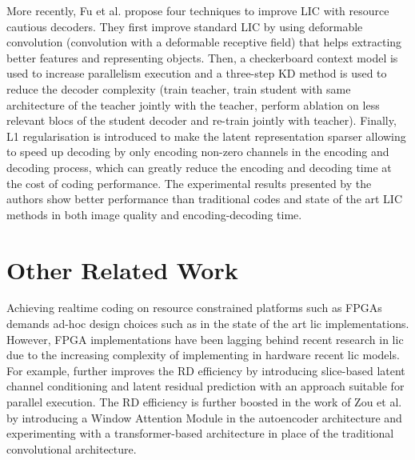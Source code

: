 More recently, Fu et al. \cite{fu2023fasthighperformancelearnedimage} propose four techniques to improve LIC with resource cautious decoders. They first improve standard LIC by using deformable convolution (convolution with a deformable receptive field) that helps extracting better features and representing objects. Then, a checkerboard context model is used to increase parallelism execution and a three-step KD method is used to reduce the decoder complexity (train teacher, train student with same architecture of the teacher jointly with the teacher, perform ablation on less relevant blocs of the student decoder and re-train jointly with teacher). Finally, L1 regularisation is introduced to make the latent representation sparser allowing to speed up decoding by only encoding non-zero channels in the encoding and decoding process, which can greatly reduce the encoding and decoding time at the cost of coding performance. The experimental results presented by the authors show better performance than traditional codes and state of the art LIC methods in both image quality and encoding-decoding time.

\section{Other Related Work}
Achieving realtime coding on resource constrained platforms such as FPGAs demands ad-hoc design choices such as in the state of the art \acrshort{lic} implementations. However, FPGA implementations have been lagging behind recent research in \acrshort{lic} due to the increasing complexity of implementing in hardware recent \acrshort{lic} models. For example, further improves the RD efficiency by introducing slice-based latent channel conditioning and latent residual prediction with an approach suitable for parallel execution. The RD efficiency is further boosted in the work of Zou et al. \cite{zou2022devildetailswindowbasedattention} by introducing a Window Attention Module in the autoencoder architecture and experimenting with a transformer-based architecture in place of the traditional convolutional architecture.